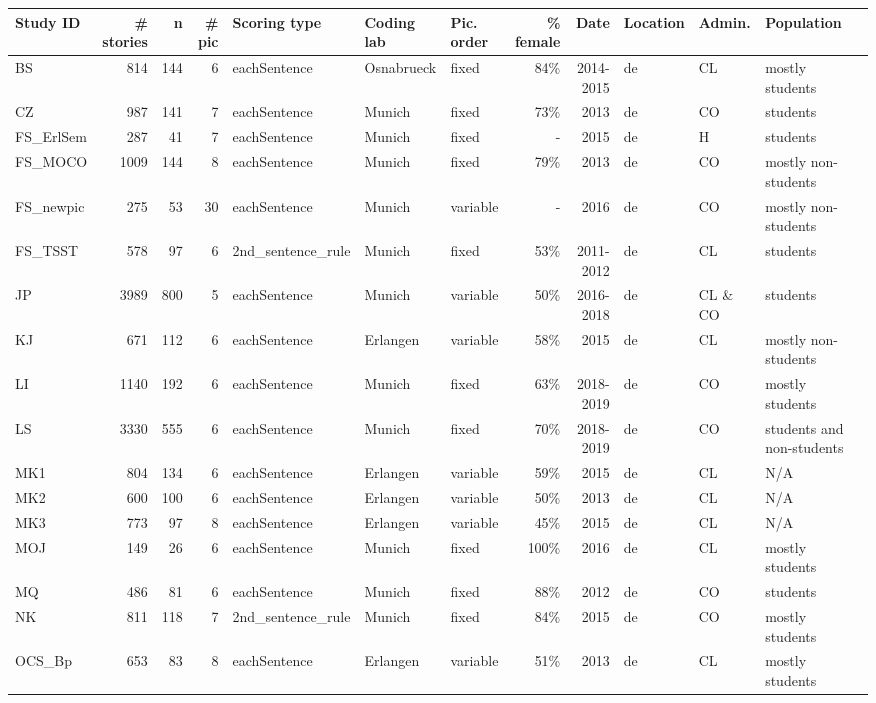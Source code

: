 \documentclass[man,a4paper,mask]{apa6}\usepackage[]{graphicx}\usepackage[]{color}
\begin{document}
\begin{table}
\begin{threeparttable}
\begin{tabularx}{\textwidth}{lrrrlllrrllll}
Study ID & \# stories & n & \# pic & Scoring type & Coding lab & Pic. order & \% female & Date & Location & Admin. & Population \\ 
  \hline
BS & 814 & 144 &   6 & eachSentence & Osnabrueck & fixed & 84\% & 2014-2015 & de & CL & mostly students \\ 
  CZ & 987 & 141 &   7 & eachSentence & Munich & fixed & 73\% & 2013 & de & CO & students \\ 
  FS\_ErlSem & 287 &  41 &   7 & eachSentence & Munich & fixed & - & 2015 & de & H & students \\ 
  FS\_MOCO & 1009 & 144 &   8 & eachSentence & Munich & fixed & 79\% & 2013 & de & CO & mostly non-students \\ 
  FS\_newpic & 275 &  53 &  30 & eachSentence & Munich & variable & - & 2016 & de & CO & mostly non-students \\ 
  FS\_TSST & 578 &  97 &   6 & 2nd\_sentence\_rule & Munich & fixed & 53\% & 2011-2012 & de & CL & students \\ 
  JP & 3989 & 800 &   5 & eachSentence & Munich & variable & 50\% & 2016-2018 & de & CL \& CO & students \\ 
  KJ & 671 & 112 &   6 & eachSentence & Erlangen & variable & 58\% & 2015 & de & CL & mostly non-students \\ 
  LI & 1140 & 192 &   6 & eachSentence & Munich & fixed & 63\% & 2018-2019 & de & CO & mostly students \\ 
  LS & 3330 & 555 &   6 & eachSentence & Munich & fixed & 70\% & 2018-2019 & de & CO & students and non-students \\ 
  MK1 & 804 & 134 &   6 & eachSentence & Erlangen & variable & 59\% & 2015 & de & CL & N/A \\ 
  MK2 & 600 & 100 &   6 & eachSentence & Erlangen & variable & 50\% & 2013 & de & CL & N/A \\ 
  MK3 & 773 &  97 &   8 & eachSentence & Erlangen & variable & 45\% & 2015 & de & CL & N/A \\ 
  MOJ & 149 &  26 &   6 & eachSentence & Munich & fixed & 100\% & 2016 & de & CL & mostly students \\ 
  MQ & 486 &  81 &   6 & eachSentence & Munich & fixed & 88\% & 2012 & de & CO & students \\ 
  NK & 811 & 118 &   7 & 2nd\_sentence\_rule & Munich & fixed & 84\% & 2015 & de & CO & mostly students \\ 
  OCS\_Bp & 653 &  83 &   8 & eachSentence & Erlangen & variable & 51\% & 2013 & de & CL & mostly students \\ 

\end{tabularx}
\end{threeparttable}
\end{table}
\end{document}
